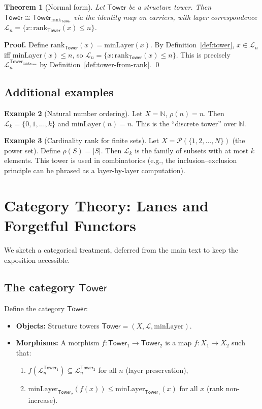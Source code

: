 \documentclass[11pt]{article}
\newtheorem{theorem}{Theorem}[section]
\theoremstyle{definition}
\newtheorem{example}[theorem]{Example}
\theoremstyle{remark}
\newcommand{\layer}{\mathcal{L}}
\newcommand{\minLayer}{\mathrm{minLayer}}
\newcommand{\rank}{\mathrm{rank}}
\newcommand{\Tower}{\mathsf{Tower}}
\newcommand{\NN}{\mathbb{N}}
\begin{document}
\begin{theorem}[Normal form]
\label{thm:normal-form-detailed}
Let $\Tower$ be a structure tower.
Then $\Tower \cong \Tower_{\rank_\Tower}$ via the identity map on carriers, with layer correspondence $\layer_n = \{x : \rank_\Tower(x) \leq n\}$.
\end{theorem}

\noindent\textbf{Proof.}
Define $\rank_\Tower(x) = \minLayer(x)$.
By Definition~\ref{def:tower}, $x \in \layer_n$ iff $\minLayer(x) \leq n$, so $\layer_n = \{x : \rank_\Tower(x) \leq n\}$.
This is precisely $\layer_n^{\Tower_{\rank_\Tower}}$ by Definition~\ref{def:tower-from-rank}.
\qed

\subsection{Additional examples}

\begin{example}[Natural number ordering]
Let $X = \NN$, $\rho(n) = n$.
Then $\layer_k = \{0,1,\ldots,k\}$ and $\minLayer(n) = n$.
This is the ``discrete tower'' over $\NN$.
\end{example}

\begin{example}[Cardinality rank for finite sets]
Let $X = \mathcal{P}(\{1,2,\ldots,N\})$ (the power set).
Define $\rho(S) = |S|$.
Then $\layer_k$ is the family of subsets with at most $k$ elements.
This tower is used in combinatorics (e.g., the inclusion--exclusion principle can be phrased as a layer-by-layer computation).
\end{example}

\section{Category Theory: Lanes and Forgetful Functors}
\label{app:cat}

We sketch a categorical treatment, deferred from the main text to keep the exposition accessible.

\subsection{The category $\mathsf{Tower}$}

Define the category $\mathsf{Tower}$:
\begin{itemize}
\item \textbf{Objects:} Structure towers $\Tower = (X, \layer, \minLayer)$.
\item \textbf{Morphisms:} A morphism $f: \Tower_1 \to \Tower_2$ is a map $f: X_1 \to X_2$ such that:
  \begin{enumerate}
  \item $f(\layer_n^{\Tower_1}) \subseteq \layer_n^{\Tower_2}$ for all $n$ (layer preservation),
  \item $\minLayer_{\Tower_2}(f(x)) \leq \minLayer_{\Tower_1}(x)$ for all $x$ (rank non-increase).
  \end{enumerate}
\end{itemize}
\end{document}
